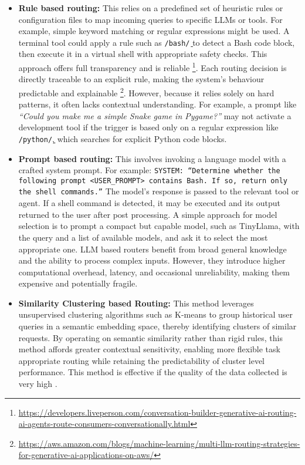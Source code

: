 \begin{itemize}
    \item \textbf{Rule based routing:} This relies on a predefined set of heuristic rules or configuration files to map incoming queries to specific LLMs or tools. For example, simple keyword matching or regular expressions might be used. A terminal tool could apply a rule such as \texttt{/bash\b/} to detect a Bash code block, then execute it in a virtual shell with appropriate safety checks. This approach offers full transparency and is reliable \footnote{\url{https://developers.liveperson.com/conversation-builder-generative-ai-routing-ai-agents-route-consumers-conversationally.html}}. Each routing decision is directly traceable to an explicit rule, making the system's behaviour predictable and explainable \footnote{\url{https://aws.amazon.com/blogs/machine-learning/multi-llm-routing-strategies-for-generative-ai-applications-on-aws/}}. However, because it relies solely on hard patterns, it often lacks contextual understanding. For example, a prompt like \textit{“Could you make me a simple Snake game in Pygame?”} may not activate a development tool if the trigger is based only on a regular expression like \texttt{/python\b/}, which searches for explicit Python code blocks.

    \item \textbf{Prompt based routing:} This involves invoking a language model with a crafted system prompt. For example: \texttt{SYSTEM: “Determine whether the following prompt <USER\_PROMPT> contains Bash. If so, return only the shell commands.”} The model's response is passed to the relevant tool or agent. If a shell command is detected, it may be executed and its output returned to the user after post processing. A simple approach for model selection is to prompt a compact but capable model, such as TinyLlama, with the query and a list of available models, and ask it to select the most appropriate one. LLM based routers benefit from broad general knowledge and the ability to process complex inputs. However, they introduce higher computational overhead, latency, and occasional unreliability, making them expensive and potentially fragile.

    \item \textbf{Similarity Clustering based Routing:} This method leverages unsupervised clustering algorithms such as K-means to group historical user queries in a semantic embedding space, thereby identifying clusters of similar requests. By operating on semantic similarity rather than rigid rules, this method affords greater contextual sensitivity, enabling more flexible task appropriate routing while retaining the predictability of cluster level performance. This method is effective if the quality of the data collected is very high \cite{varangotreille2025doingimplementingrouting}.


\end{itemize}
